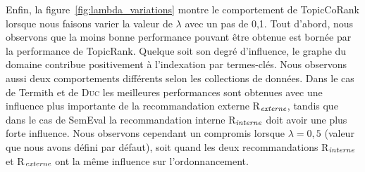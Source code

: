         Enfin, la figure~\ref{fig:lambda_variations} montre le comportement de
        TopicCoRank lorsque nous faisons varier la valeur de $\lambda$ avec un
        pas de 0,1. Tout d'abord, nous observons que la moins bonne performance
        pouvant être obtenue est bornée par la performance de TopicRank. Quelque
        soit son degré d'influence, le graphe du domaine contribue positivement
        à l'indexation par termes-clés. Nous observons aussi deux comportements
        différents selon les collections de données. Dans le cas de Termith et
        de \textsc{Duc} les meilleures performances sont obtenues avec une
        influence plus importante de la recommandation externe
        R$_\textnormal{\textit{externe}}$, tandis que dans le cas de SemEval la
        recommandation interne R$_\textnormal{\textit{interne}}$ doit avoir une
        plus forte influence. Nous observons cependant un compromis lorsque
        $\lambda = 0,5$ (valeur que nous avons défini par défaut), soit quand
        les deux recommandations R$_\textnormal{\textit{interne}}$ et
        R$_\textnormal{\textit{externe}}$ ont la même influence sur
        l'ordonnancement.
